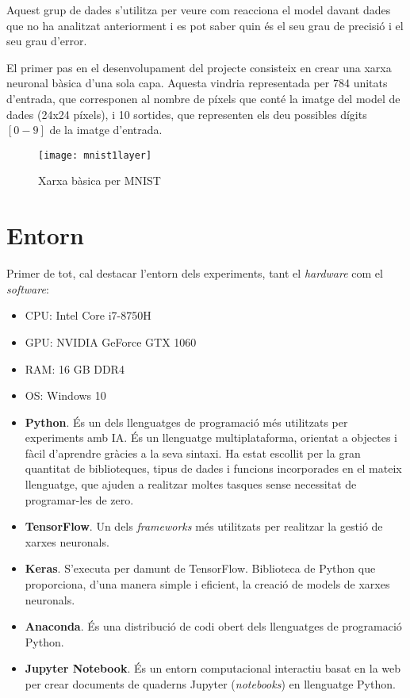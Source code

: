 \begin{refsection}
\begin{itemize}
		Aquest grup de dades s'utilitza per veure com reacciona el model davant dades que no ha analitzat anteriorment i es pot saber quin és el seu grau de precisió i el seu grau d'error.

	\end{itemize}

	El primer pas en el desenvolupament del projecte consisteix en crear una xarxa neuronal bàsica d'una sola capa. Aquesta vindria representada per 784 unitats d'entrada, que corresponen al nombre de píxels que conté la imatge del model de dades (24x24 píxels), i 10 sortides, que representen els deu possibles dígits $[0 - 9]$ de la imatge d'entrada.
	
	\begin{figure}[h]
		\texttt{[image: mnist1layer]}
		\caption{Xarxa bàsica per MNIST\protect\supercite{Ml4a}}
	\end{figure}

	\section{Entorn}
	
	Primer de tot, cal destacar l’entorn dels experiments, tant el \textit{hardware} com el \textit{software}:
	
	\begin{itemize}
		\item CPU: Intel Core i7-8750H
		\item GPU: NVIDIA GeForce GTX 1060
		\item RAM: 16 GB DDR4
		\item OS: Windows 10
		\item \textbf{Python}. És un dels llenguatges de programació més utilitzats per experiments amb IA. És un llenguatge multiplataforma, orientat a objectes i fàcil d'aprendre gràcies a la seva sintaxi. Ha estat escollit per la gran quantitat de biblioteques, tipus de dades i funcions
		incorporades en el mateix llenguatge, que ajuden a realitzar moltes tasques sense necessitat de programar-les de zero.\supercite{Python}
		\item \textbf{TensorFlow}. Un dels \textit{frameworks} més utilitzats per realitzar la gestió de xarxes neuronals.\supercite{TDS10}
		\item \textbf{Keras}. S'executa per damunt de TensorFlow. Biblioteca de Python que proporciona, d'una manera simple i eficient, la creació de models de xarxes neuronals.\supercite{Keras,TDS10}
		\item \textbf{Anaconda}. És una distribució de codi obert dels llenguatges de programació Python.\supercite{Anaconda}
		\item \textbf{Jupyter Notebook}. És un entorn computacional interactiu basat en la web per crear documents de quaderns Jupyter (\textit{notebooks}) en llenguatge Python.\supercite{Jupyter}
	\end{itemize}


\end{refsection}
